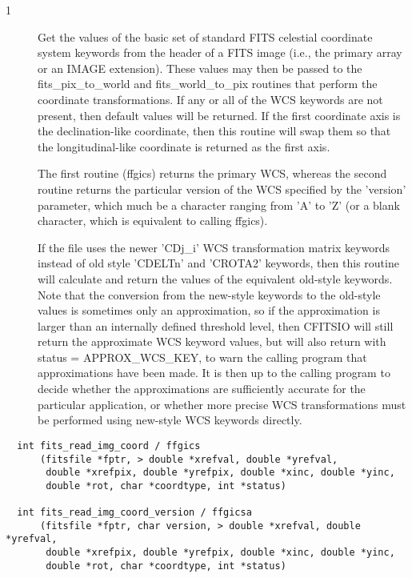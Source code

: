 \documentclass[11pt]{book}
\begin{document}
\begin{description}
\item[1 ] Get the values of the basic set of standard FITS celestial coordinate
    system keywords from the header of a FITS image (i.e., the primary
    array or an IMAGE extension).  These values may then be passed to
    the fits\_pix\_to\_world and fits\_world\_to\_pix routines that
    perform the coordinate transformations.  If any or all of the WCS
    keywords are not present, then default values will be returned. If
    the first coordinate axis is the declination-like coordinate, then
    this routine will swap them so that the longitudinal-like coordinate
    is returned as the first axis.

    The first routine (ffgics) returns
    the primary WCS, whereas the second routine returns the particular
    version of the WCS specified by the 'version' parameter, which much
    be a character ranging from 'A' to 'Z' (or a blank character, which is
    equivalent to calling ffgics).

    If the file uses the newer 'CDj\_i' WCS transformation matrix
    keywords instead of old style 'CDELTn' and 'CROTA2' keywords, then
    this routine will calculate and return the values of the equivalent
    old-style keywords.  Note that the conversion from the new-style
    keywords to the old-style values is sometimes only an
    approximation, so if the approximation is larger than an internally
    defined threshold level, then CFITSIO will still return the
    approximate WCS keyword values, but will also return with status =
    APPROX\_WCS\_KEY, to warn the calling program that approximations
    have been made.  It is then up to the calling program to decide
    whether the approximations are sufficiently accurate for the
    particular application, or whether more precise WCS transformations
   must be performed using new-style WCS keywords directly. \label{ffgics}
\end{description}

\begin{verbatim}
  int fits_read_img_coord / ffgics
      (fitsfile *fptr, > double *xrefval, double *yrefval,
       double *xrefpix, double *yrefpix, double *xinc, double *yinc,
       double *rot, char *coordtype, int *status)

  int fits_read_img_coord_version / ffgicsa
      (fitsfile *fptr, char version, > double *xrefval, double *yrefval,
       double *xrefpix, double *yrefpix, double *xinc, double *yinc,
       double *rot, char *coordtype, int *status)
\end{verbatim}
\end{document}
